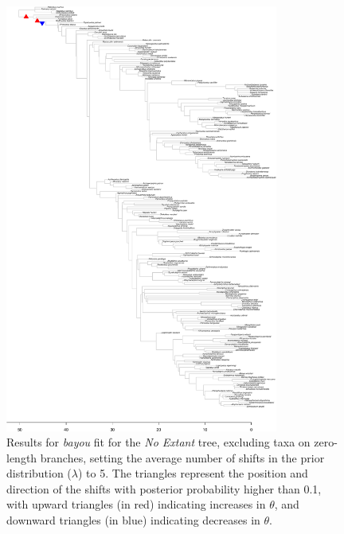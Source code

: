 \begin{figure}[H]
\includegraphics[width=0.8\textwidth]{img/plots-noextant-k5-1.pdf}
\caption{Results for \textit{bayou} fit for the \textit{No Extant} tree, excluding taxa on zero-length branches, setting the average number of shifts in the prior distribution ($\lambda$) to 5. The triangles represent the position and direction of the shifts with posterior probability higher than 0.1, with upward triangles (in red) indicating increases in $\theta$, and downward triangles (in blue) indicating decreases in $\theta$.}
\label{fig:extant-k5-nzlb}
\end{figure}

\newpage

